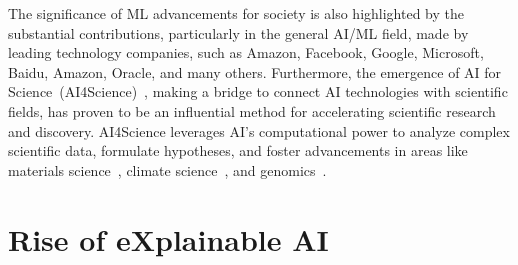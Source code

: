 The significance of ML advancements for society is also highlighted by 
the substantial contributions, particularly in
the general AI/ML field, made by leading technology companies,
such as Amazon, Facebook, Google, Microsoft, Baidu, Amazon, Oracle,
and many others.
%
Furthermore, the emergence of AI for Science~(AI4Science)~\cite{ai4sci-corr23,aiqtcs-corr23}, 
making a bridge to connect AI technologies with scientific fields, 
has proven to be an influential method for accelerating scientific research and discovery.
%
AI4Science leverages AI's computational power to analyze complex scientific data, formulate hypotheses, 
and foster advancements in areas like materials science~\cite{bdciw-nature18}, 
climate science~\cite{khu-natureg20,dbcl-gmd23}, and genomics~\cite{aige-aihl23,wsnp-nrg22}.



\section{Rise of eXplainable AI} \label{sec:risexai}

